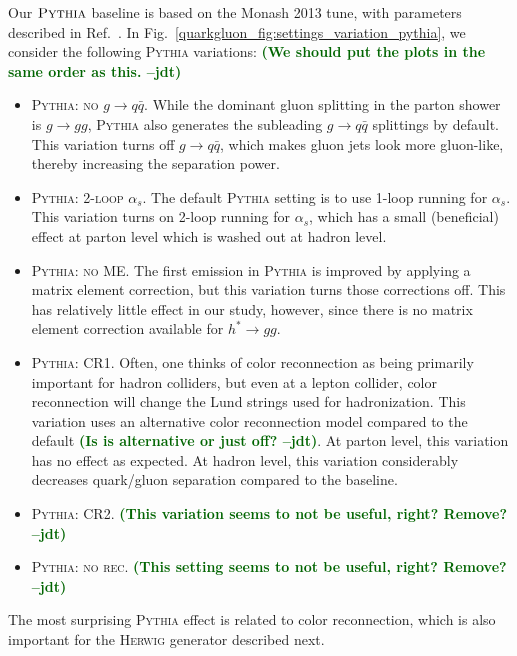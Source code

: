 \documentclass[11pt]{cernrep}
\newcommand{\jdt}[1]{\textbf{\textcolor{darkgreen}{(#1 --jdt)}}}
\begin{document}
Our $\textsc{Pythia}$ baseline is based on the Monash 2013 tune, with parameters described in Ref.~\cite{Skands:2014pea}.  In Fig.~\ref{quarkgluon_fig:settings_variation_pythia}, we consider the following \textsc{Pythia} variations:  \jdt{We should put the plots in the same order as this.}
\begin{itemize}
\item \textsc{Pythia: no $g \to q\bar{q}$}.  While the dominant gluon splitting in the parton shower is $g \to gg$, \textsc{Pythia} also generates the subleading $g \to q \bar{q}$ splittings by default.  This variation turns off $g \to q \bar{q}$, which makes gluon jets look more gluon-like, thereby increasing the separation power.
\item \textsc{Pythia: 2-loop $\alpha_s$}.  The default \textsc{Pythia} setting is to use 1-loop running for $\alpha_s$.  This variation turns on 2-loop running for $\alpha_s$, which has a small (beneficial) effect at parton level which is washed out at hadron level.
\item \textsc{Pythia: no ME}.  The first emission in \textsc{Pythia} is improved by applying a matrix element correction, but this variation turns those corrections off.  This  has relatively little effect in our study, however, since there is no matrix element correction available for $h^* \to g g$.
\item \textsc{Pythia: CR1}.  Often, one thinks of color reconnection as being primarily important for hadron colliders, but even at a lepton collider, color reconnection will change the Lund strings used for hadronization.  This variation uses an alternative color reconnection model compared to the default \jdt{Is is alternative or just off?}.  At parton level, this variation has no effect as expected.  At hadron level, this variation considerably decreases quark/gluon separation compared to the baseline.
\item \textsc{Pythia: CR2}.  \jdt{This variation seems to not be useful, right?  Remove?}
\item \textsc{Pythia: no rec}.  \jdt{This setting seems to not be useful, right? Remove?}
\end{itemize}
The most surprising \textsc{Pythia} effect is related to color reconnection, which is also important for the \textsc{Herwig} generator described next.
\end{document}
